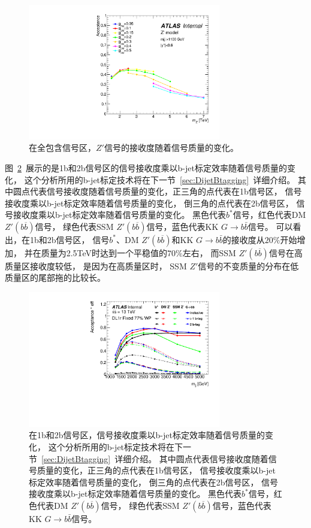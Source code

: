 \begin{figure}[thbp]
  \centering
  \includegraphics[width=0.75\textwidth]{figuresDijet/03-BenchmarkSignals/Acc_Zprime.pdf}
  \caption{ 在全包含信号区，$Z'$信号的接收度随着信号质量的变化。 }
  \label{fig:ACCPZ}
\end{figure}

图~\ref{fig:ACCPB}~展示的是1b和2b信号区的信号接收度乘以b-jet标定效率随着信号质量的变化，
这个分析所用的b-jet标定技术将在下一节~\ref{sec:DijetBtagging}~详细介绍。
其中圆点代表信号接收度随着信号质量的变化，正三角的点代表在1b信号区，
信号接收度乘以b-jet标定效率随着信号质量的变化，
倒三角的点代表在2b信号区，
信号接收度乘以b-jet标定效率随着信号质量的变化。
黑色代表$b^*$信号，红色代表DM $Z'(b\overline{b})$信号，
绿色代表SSM $Z'(b\overline{b})$信号，蓝色代表KK $G \rightarrow b\bar{b}$信号。
可以看出，在1b和2b信号区，
信号$b^*$、DM $Z'(b\overline{b})$和KK $G \rightarrow b\bar{b}$的接收度从$20\%$开始增加，
并在质量为2.5TeV时达到一个平稳值的$70\%$左右，
而SSM $Z'(b\overline{b})$信号在高质量区接收度较低，
是因为在高质量区时，
SSM $Z'$信号的不变质量的分布在低质量区的尾部拖的比较长。

 
 \begin{figure}[thbp]
  \centering
  \includegraphics[width=0.75\textwidth]{figuresDijet/03-BenchmarkSignals/Acceff_DL1r_Fix77.pdf}
  \caption{ 在1b和2b信号区，信号接收度乘以b-jet标定效率随着信号质量的变化，
这个分析所用的b-jet标定技术将在下一节~\ref{sec:DijetBtagging}~详细介绍。
其中圆点代表信号接收度随着信号质量的变化，正三角的点代表在1b信号区，
信号接收度乘以b-jet标定效率随着信号质量的变化，
倒三角的点代表在2b信号区，
信号接收度乘以b-jet标定效率随着信号质量的变化。
黑色代表$b^*$信号，红色代表DM $Z'(b\overline{b})$信号，
绿色代表SSM $Z'(b\overline{b})$信号，蓝色代表KK $G \rightarrow b\bar{b}$信号。 }
  \label{fig:ACCPB}
\end{figure}
 
